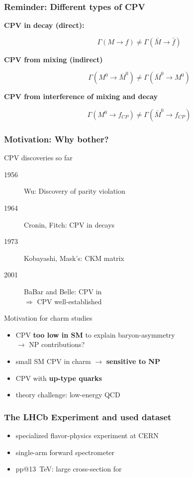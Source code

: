 \documentclass[18pt, aspectratio=169]{beamer}
\newcommand{\kitemph}[1]{\textcolor{kit-green100}{\bf{#1}}}
\begin{document}
\begin{frame}
  \frametitle{Reminder: Different types of CPV}
  \begin{description}
  \item[\textbf{CPV in decay (direct):}]
    \[\Gamma(M \rightarrow f) \neq \Gamma(\bar{M} \rightarrow \bar{f})\]
 \item[\textbf{CPV from mixing (indirect)}]
   \[\Gamma(M^0 \rightarrow \bar{M}^0) \neq \Gamma(\bar{M}^0 \rightarrow M^0)\]
 \item[\textbf{CPV from interference of mixing and decay}]
   \[\Gamma(M^0 \rightarrow f_{CP}) \neq \Gamma(\bar{M}^0 \rightarrow f_{CP})\]
  \end{description}
\end{frame}

\begin{frame}
  \frametitle{Motivation: Why bother?}
  \begin{block}{CPV discoveries so far}
    \begin{description}
    \item[1956] Wu: Discovery of parity violation
    \item[1964] Cronin, Fitch: CPV in \PK decays
    \item[1973] Kobayashi, Mask's: CKM matrix
    \item[2001] BaBar and Belle: CPV in \PBzero\\
      $\Rightarrow$ CPV well-established
    \end{description}
  \end{block}
  \pause
  \begin{exampleblock}{Motivation for charm studies}
    \begin{itemize}
    \item CPV \kitemph{too low in SM} to explain baryon-asymmetry\\
      $\rightarrow$ NP contributions?
    \item small SM CPV in charm $\rightarrow$ \kitemph{sensitive to NP}
    \item CPV with \kitemph{up-type quarks}
    \item theory challenge: low-energy QCD
    \end{itemize}
  \end{exampleblock}
\end{frame}

\begin{frame}
  \frametitle{The LHCb Experiment and used dataset}
  \begin{itemize}
  \item specialized flavor-physics experiment at CERN
  \item single-arm forward spectrometer
  \item pp@\SI{13}{\TeV}: large cross-section for 
  \end{itemize}
\end{frame}
\end{document}
